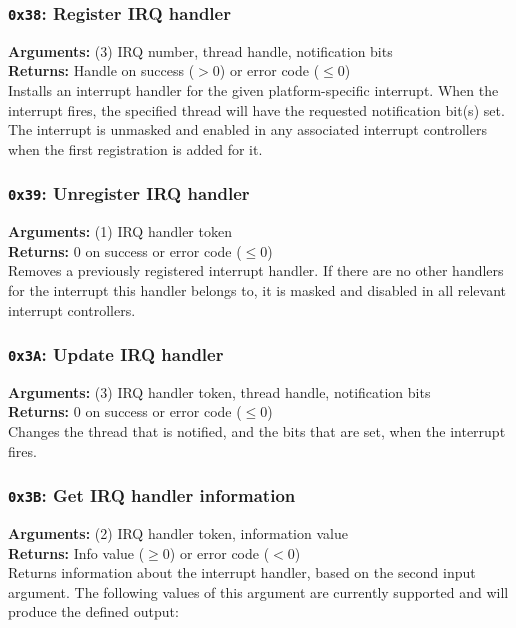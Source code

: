 \documentclass[11pt]{article}
\begin{document}
\subsubsection{{\tt 0x38}: Register IRQ handler}
\textbf{Arguments:} (3) IRQ number, thread handle, notification bits \\
\textbf{Returns:} Handle on success ($> 0$) or error code ($\leq0$) \\

Installs an interrupt handler for the given platform-specific interrupt. When the interrupt fires, the specified thread will have the requested notification bit(s) set. The interrupt is unmasked and enabled in any associated interrupt controllers when the first registration is added for it.

\subsubsection{{\tt 0x39}: Unregister IRQ handler}
\textbf{Arguments:} (1) IRQ handler token \\
\textbf{Returns:} 0 on success or error code ($\leq0$) \\

Removes a previously registered interrupt handler. If there are no other handlers for the interrupt this handler belongs to, it is masked and disabled in all relevant interrupt controllers. 

\subsubsection{{\tt 0x3A}: Update IRQ handler}
\textbf{Arguments:} (3) IRQ handler token, thread handle, notification bits \\
\textbf{Returns:} 0 on success or error code ($\leq0$) \\

Changes the thread that is notified, and the bits that are set, when the interrupt fires.

\subsubsection{{\tt 0x3B}: Get IRQ handler information}
\textbf{Arguments:} (2) IRQ handler token, information value \\
\textbf{Returns:} Info value ($\geq 0$) or error code ($< 0$) \\

Returns information about the interrupt handler, based on the second input argument. The following values of this argument are currently supported and will produce the defined output:
\end{document}
